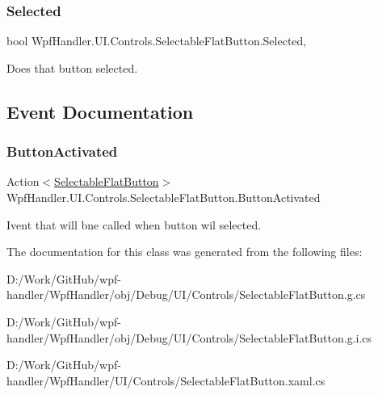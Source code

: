 \subsubsection{\texorpdfstring{Selected}{Selected}}
{\footnotesize\ttfamily bool Wpf\+Handler.\+U\+I.\+Controls.\+Selectable\+Flat\+Button.\+Selected\hspace{0.3cm}{\ttfamily [get]}, {\ttfamily [set]}}



Does that button selected. 



\subsection{Event Documentation}
\mbox{\label{class_wpf_handler_1_1_u_i_1_1_controls_1_1_selectable_flat_button_aa36bac42f7eef1ba46a8a5dc8f071c19}} 
\subsubsection{\texorpdfstring{Button\+Activated}{ButtonActivated}}
{\footnotesize\ttfamily Action$<$\mbox{\hyperlink{class_wpf_handler_1_1_u_i_1_1_controls_1_1_selectable_flat_button}{Selectable\+Flat\+Button}}$>$ Wpf\+Handler.\+U\+I.\+Controls.\+Selectable\+Flat\+Button.\+Button\+Activated\hspace{0.3cm}{\ttfamily [static]}}



Ivent that will bne called when button wil selected. 



The documentation for this class was generated from the following files\+:\begin{DoxyCompactItemize}
\item 
D\+:/\+Work/\+Git\+Hub/wpf-\/handler/\+Wpf\+Handler/obj/\+Debug/\+U\+I/\+Controls/Selectable\+Flat\+Button.\+g.\+cs\item 
D\+:/\+Work/\+Git\+Hub/wpf-\/handler/\+Wpf\+Handler/obj/\+Debug/\+U\+I/\+Controls/Selectable\+Flat\+Button.\+g.\+i.\+cs\item 
D\+:/\+Work/\+Git\+Hub/wpf-\/handler/\+Wpf\+Handler/\+U\+I/\+Controls/Selectable\+Flat\+Button.\+xaml.\+cs\end{DoxyCompactItemize}
